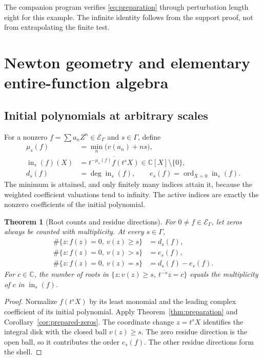 \documentclass[11pt,letterpaper]{article}
\numberwithin{equation}{section}
\newtheorem{theorem}{Theorem}[section]
\theoremstyle{definition}
\theoremstyle{remark}
\newcommand{\C}{\mathbb C}
\newcommand{\ord}{\operatorname{ord}}
\newcommand{\ini}{\operatorname{in}}
\newcommand{\red}[1]{\overline{#1}}
\begin{document}
The companion program verifies \eqref{eq:preparation} through perturbation
length eight for this example. The infinite identity follows from the support
proof, not from extrapolating the finite test.

\section{Newton geometry and elementary entire-function algebra}
\label{sec:zeros}

\subsection{Initial polynomials at arbitrary scales}
For a nonzero $f=\sum a_nZ^n\in\mathcal E_\Gamma$ and $s\in\Gamma$, define
\begin{align}
 \mu_s(f)&=\min_n\bigl(v(a_n)+ns\bigr),\label{eq:mu}\\
 \ini_s(f)(X)&=\red{t^{-\mu_s(f)}f(t^sX)}\in\C[X]\setminus\{0\},
 \label{eq:initial}\\
 d_s(f)&=\deg\ini_s(f),\qquad
 e_s(f)=\ord_{X=0}\ini_s(f).\label{eq:de}
\end{align}
The minimum is attained, and only finitely many indices attain it, because
the weighted coefficient valuations tend to infinity. The active indices
are exactly the nonzero coefficients of the initial polynomial.

\begin{theorem}[Root counts and residue directions]\label{thm:root-counts}
For $0\ne f\in\mathcal E_\Gamma$, let zeros always be counted with
multiplicity. At every $s\in\Gamma$,
\begin{align*}
 \#\{z:f(z)=0,\ v(z)\ge s\}&=d_s(f),\\
 \#\{z:f(z)=0,\ v(z)>s\}&=e_s(f),\\
 \#\{z:f(z)=0,\ v(z)=s\}&=d_s(f)-e_s(f).
\end{align*}
For $c\in\C$, the number of roots in
$\{z:v(z)\ge s,\ \red{t^{-s}z}=c\}$ equals the multiplicity of $c$ in
$\ini_s(f)$.
\end{theorem}
\begin{proof}
Normalize $f(t^sX)$ by its least monomial and the leading complex coefficient
of its initial polynomial. Apply Theorem~\ref{thm:preparation} and
Corollary~\ref{cor:prepared-zeros}. The coordinate change $z=t^sX$
identifies the integral disk with the closed ball $v(z)\ge s$. The zero
residue direction is the open ball, so it contributes the order $e_s(f)$.
The other residue directions form the shell.
\end{proof}
\end{document}
